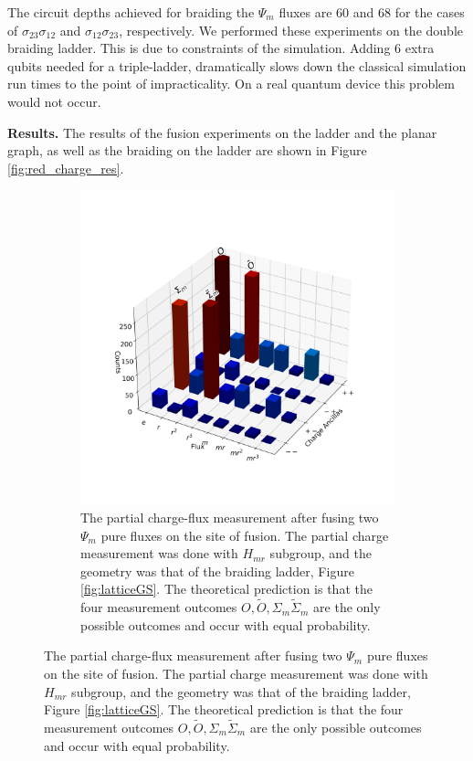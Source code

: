 \documentclass[a4paper,twocolumn,11pt, accepted=2024-06-14]{quantumarticle}
\begin{document}
The circuit depths achieved for braiding the $\Psi_m$ fluxes are 60 and 68 for the cases of $\sigma_{23}\sigma_{12}$ and $\sigma_{12}\sigma_{23}$, respectively. We performed these experiments on the double braiding ladder. This is due to constraints of the simulation. Adding 6 extra qubits needed for a triple-ladder, dramatically slows down the classical simulation run times to the point of impracticality. On a real quantum device this problem would not occur.



\textbf{Results.}
The results of the fusion experiments on the ladder and the planar graph, as well as the braiding on the ladder are shown in Figure \ref{fig:red_charge_res}.

\begin{figure}
\centering
\begin{subfigure}{0.47\textwidth}
    \includegraphics[width = \linewidth]{Figures/fusion_on_glasses.png}
    \caption{The partial charge-flux measurement after fusing two $\Psi_m$ pure fluxes on the site of fusion. The partial charge measurement was done with $H_{mr}$ subgroup, and the geometry was that of the braiding ladder, Figure \ref{fig:latticeGS}. The theoretical prediction is that the four measurement outcomes $O,\tilde O,\Sigma_m \tilde{\Sigma}_m$ are the only possible outcomes and occur with equal probability.}

\end{subfigure}
\end{figure}
\end{document}

